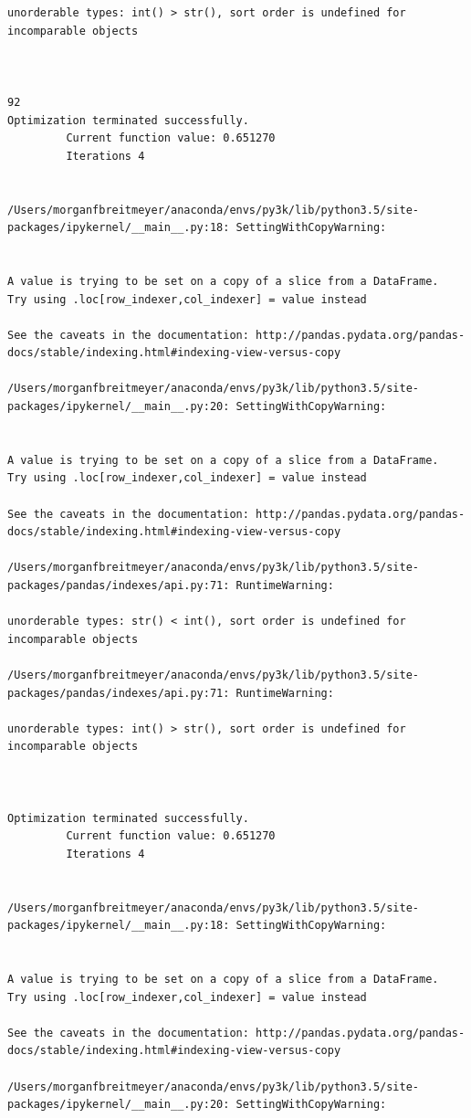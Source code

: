 \begin{lstlisting}
unorderable types: int() > str(), sort order is undefined for incomparable objects



92
Optimization terminated successfully.
         Current function value: 0.651270
         Iterations 4


/Users/morganfbreitmeyer/anaconda/envs/py3k/lib/python3.5/site-packages/ipykernel/__main__.py:18: SettingWithCopyWarning:


A value is trying to be set on a copy of a slice from a DataFrame.
Try using .loc[row_indexer,col_indexer] = value instead

See the caveats in the documentation: http://pandas.pydata.org/pandas-docs/stable/indexing.html#indexing-view-versus-copy

/Users/morganfbreitmeyer/anaconda/envs/py3k/lib/python3.5/site-packages/ipykernel/__main__.py:20: SettingWithCopyWarning:


A value is trying to be set on a copy of a slice from a DataFrame.
Try using .loc[row_indexer,col_indexer] = value instead

See the caveats in the documentation: http://pandas.pydata.org/pandas-docs/stable/indexing.html#indexing-view-versus-copy

/Users/morganfbreitmeyer/anaconda/envs/py3k/lib/python3.5/site-packages/pandas/indexes/api.py:71: RuntimeWarning:

unorderable types: str() < int(), sort order is undefined for incomparable objects

/Users/morganfbreitmeyer/anaconda/envs/py3k/lib/python3.5/site-packages/pandas/indexes/api.py:71: RuntimeWarning:

unorderable types: int() > str(), sort order is undefined for incomparable objects



Optimization terminated successfully.
         Current function value: 0.651270
         Iterations 4


/Users/morganfbreitmeyer/anaconda/envs/py3k/lib/python3.5/site-packages/ipykernel/__main__.py:18: SettingWithCopyWarning:


A value is trying to be set on a copy of a slice from a DataFrame.
Try using .loc[row_indexer,col_indexer] = value instead

See the caveats in the documentation: http://pandas.pydata.org/pandas-docs/stable/indexing.html#indexing-view-versus-copy

/Users/morganfbreitmeyer/anaconda/envs/py3k/lib/python3.5/site-packages/ipykernel/__main__.py:20: SettingWithCopyWarning:



\end{lstlisting}
